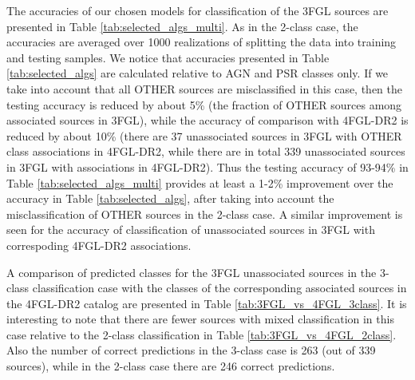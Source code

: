 The accuracies of our chosen models for classification of the 3FGL sources are presented in Table \ref{tab:selected_algs_multi}.
As in the 2-class case, the accuracies are averaged over 1000 realizations of splitting the data into training and testing samples.
We notice that accuracies presented in Table \ref{tab:selected_algs} are calculated relative to AGN and PSR classes only. If we take into account that all OTHER sources
are misclassified in this case, then the testing accuracy is reduced by about 5\% (the fraction of OTHER sources among associated sources in 3FGL),
while the accuracy of comparison with 4FGL-DR2 is reduced by about 10\% (there are 37 unassociated sources in 3FGL with OTHER class associations in 4FGL-DR2,
while there are in total 339 unassociated sources in 3FGL with associations in 4FGL-DR2).
Thus the testing accuracy of 93-94\% in Table \ref{tab:selected_algs_multi} provides at least a 1-2\% improvement over the accuracy in Table \ref{tab:selected_algs},
after taking into account the misclassification of OTHER sources in the 2-class case.
A similar improvement is seen for the accuracy of classification of unassociated sources in 3FGL with correspoding 4FGL-DR2 associations.

A comparison of predicted classes for the 3FGL unassociated sources in the 3-class classification case with the classes of the corresponding associated sources in the 4FGL-DR2 catalog are presented in Table \ref{tab:3FGL_vs_4FGL_3class}.
It is interesting to note that there are fewer sources with mixed classification in this case relative to the 2-class classification in 
Table \ref{tab:3FGL_vs_4FGL_2class}.
Also the number of correct predictions in the 3-class case is 263 (out of 339 sources), while in the 2-class case there are 246 correct predictions.

